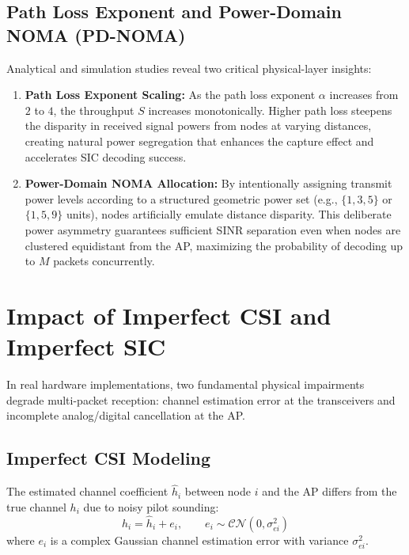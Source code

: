 \subsection{Path Loss Exponent and Power-Domain NOMA (PD-NOMA)}
Analytical and simulation studies reveal two critical physical-layer insights:
\begin{enumerate}
    \item \textbf{Path Loss Exponent Scaling:} As the path loss exponent $\alpha$ increases from $2$ to $4$, the throughput $S$ increases monotonically. Higher path loss steepens the disparity in received signal powers from nodes at varying distances, creating natural power segregation that enhances the capture effect and accelerates SIC decoding success.
    \item \textbf{Power-Domain NOMA Allocation:} By intentionally assigning transmit power levels according to a structured geometric power set (e.g., $\{1, 3, 5\}$ or $\{1, 5, 9\}$ units), nodes artificially emulate distance disparity. This deliberate power asymmetry guarantees sufficient SINR separation even when nodes are clustered equidistant from the AP, maximizing the probability of decoding up to $M$ packets concurrently.
\end{enumerate}

\section{Impact of Imperfect CSI and Imperfect SIC}
In real hardware implementations, two fundamental physical impairments degrade multi-packet reception: channel estimation error at the transceivers and incomplete analog/digital cancellation at the AP.

\subsection{Imperfect CSI Modeling}
The estimated channel coefficient $\hat{h}_i$ between node $i$ and the AP differs from the true channel $h_i$ due to noisy pilot sounding:
\begin{equation}
    h_i = \hat{h}_i + e_i, \qquad e_i \sim \mathcal{CN}(0, \sigma_{ei}^2)
\end{equation}
where $e_i$ is a complex Gaussian channel estimation error with variance $\sigma_{ei}^2$.

